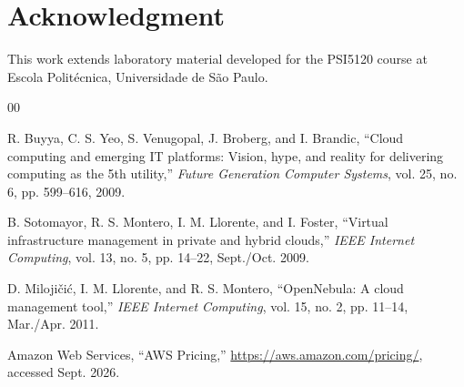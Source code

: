 \documentclass[conference]{IEEEtran}
\begin{document}
\section*{Acknowledgment}
This work extends laboratory material developed for the PSI5120 course at Escola Politécnica, Universidade de São Paulo.

\begin{thebibliography}{00}

R. Buyya, C. S. Yeo, S. Venugopal, J. Broberg, and I. Brandic, ``Cloud computing and emerging IT platforms: Vision, hype, and reality for delivering computing as the 5th utility,'' \emph{Future Generation Computer Systems}, vol. 25, no. 6, pp. 599--616, 2009.

B. Sotomayor, R. S. Montero, I. M. Llorente, and I. Foster, ``Virtual infrastructure management in private and hybrid clouds,'' \emph{IEEE Internet Computing}, vol. 13, no. 5, pp. 14--22, Sept./Oct. 2009.

D. Milojičić, I. M. Llorente, and R. S. Montero, ``OpenNebula: A cloud management tool,'' \emph{IEEE Internet Computing}, vol. 15, no. 2, pp. 11--14, Mar./Apr. 2011.

Amazon Web Services, ``AWS Pricing,'' \url{https://aws.amazon.com/pricing/}, accessed Sept. 2026.

\end{thebibliography}
\end{document}
